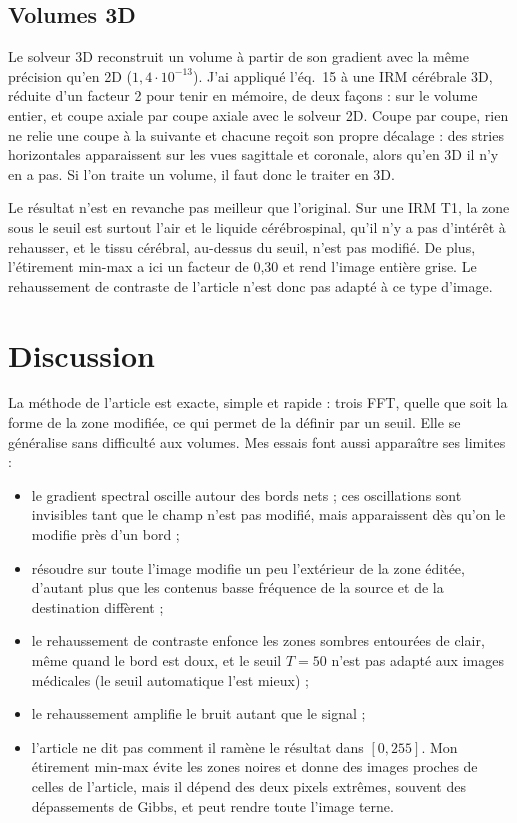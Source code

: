 \documentclass[11pt,a4paper]{article}
\begin{document}
\subsection{Volumes 3D}

Le solveur 3D reconstruit un volume à partir de son gradient avec la même précision qu'en 2D
($1{,}4\cdot10^{-13}$). J'ai appliqué l'éq.~15 à une IRM cérébrale 3D, réduite d'un facteur 2 pour tenir
en mémoire, de deux façons : sur le volume entier, et coupe axiale par coupe axiale avec le solveur 2D.
Coupe par coupe, rien ne relie une coupe à la suivante et chacune reçoit son propre décalage : des stries
horizontales apparaissent sur les vues sagittale et coronale, alors qu'en 3D il n'y en a pas. Si l'on
traite un volume, il faut donc le traiter en 3D.

Le résultat n'est en revanche pas meilleur que l'original. Sur une IRM T1, la zone sous le seuil est
surtout l'air et le liquide cérébrospinal, qu'il n'y a pas d'intérêt à rehausser, et le tissu cérébral,
au-dessus du seuil, n'est pas modifié. De plus, l'étirement min-max a ici un facteur de 0,30 et rend
l'image entière grise. Le rehaussement de contraste de l'article n'est donc pas adapté à ce type d'image.

\section{Discussion}

La méthode de l'article est exacte, simple et rapide : trois FFT, quelle que soit la forme de la zone
modifiée, ce qui permet de la définir par un seuil. Elle se généralise sans difficulté aux volumes.
Mes essais font aussi apparaître ses limites :
\begin{itemize}
  \item le gradient spectral oscille autour des bords nets ; ces oscillations sont invisibles tant que le
  champ n'est pas modifié,
  mais apparaissent dès qu'on le modifie près d'un bord ;
  \item résoudre sur toute l'image modifie un peu l'extérieur de la zone éditée, d'autant plus que les
  contenus basse fréquence de la source et de la destination diffèrent ;
  \item le rehaussement de contraste enfonce les zones sombres entourées de clair, même quand le bord est
  doux, et le seuil $T=50$ n'est pas adapté aux images médicales (le seuil automatique l'est mieux) ;
  \item le rehaussement amplifie le bruit autant que le signal ;
  \item l'article ne dit pas comment il ramène le résultat dans $[0,255]$. Mon étirement min-max évite
  les zones noires et donne des images proches de celles de l'article, mais il dépend des deux pixels
  extrêmes, souvent des dépassements de Gibbs, et peut rendre toute l'image terne.
\end{itemize}
\end{document}

